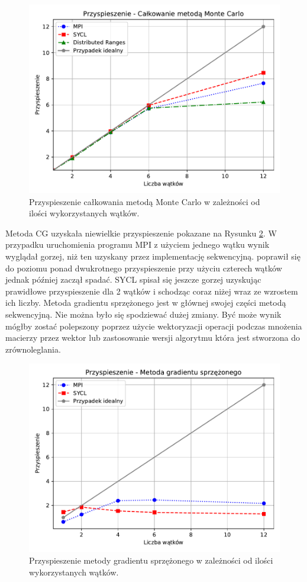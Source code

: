 \documentclass[a4paper,12pt]{book} %
\begin{document}
\begin{figure}
	\centering
	\includegraphics[scale=1]{assets/przyspieszenie_calkowanie.pdf}
	\caption{Przyspieszenie całkowania metodą Monte Carlo w zależności od ilości wykorzystanych wątków.}
	\label{fig:monte-carlo-speedup}
\end{figure}

Metoda CG uzyskała niewielkie przyspieszenie pokazane na Rysunku \ref{fig:cg-speedup}. W przypadku uruchomienia programu MPI z użyciem jednego wątku wynik wyglądał gorzej, niż ten uzyskany przez implementację sekwencyjną. poprawił się do poziomu ponad dwukrotnego przyspieszenie przy użyciu czterech wątków jednak później zaczął spadać. SYCL spisał się jeszcze gorzej uzyskując prawidłowe przyspieszenie dla 2 wątków i schodząc coraz niżej wraz ze wzrostem ich liczby. Metoda gradientu sprzężonego jest w głównej swojej części metodą sekwencyjną. Nie można było się spodziewać dużej zmiany. Być może wynik mógłby zostać polepszony poprzez użycie wektoryzacji operacji podczas mnożenia macierzy przez wektor lub zastosowanie wersji algorytmu która jest stworzona do zrównoleglania.

\begin{figure}
	\centering
	\includegraphics[scale=1]{assets/przyspieszenie_cg.pdf}
	\caption{Przyspieszenie metody gradientu sprzężonego w zależności od ilości wykorzystanych wątków.}
	\label{fig:cg-speedup}
\end{figure}
\end{document}
